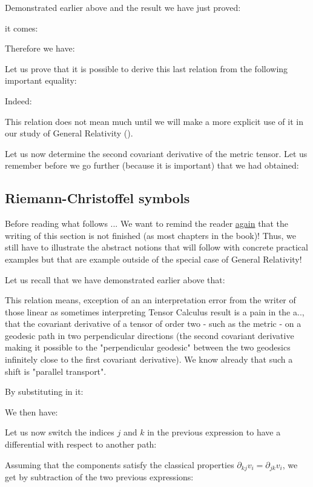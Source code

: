 	Demonstrated earlier above and the result we have just proved:
	
	it comes:
	
	Therefore we have:
	
	Let us prove that it is possible to derive this last relation from the following important equality:
	
	Indeed:
	
	This relation does not mean much until we will make a more explicit use of it in our study of General Relativity ().

	Let us now determine the second covariant derivative of the metric tensor. Let us remember before we go further (because it is important) that we had obtained:
	
	
	\subsection{Riemann-Christoffel symbols}\label{Riemann-Christoffel symbols}
	\begin{tcolorbox}[colback=red!5,borderline={1mm}{2mm}{red!5},arc=0mm,boxrule=0pt]
	\bcbombe Before reading what follows ... We want to remind the reader \underline{again} that the writing of this section is not finished (as most chapters in the book)! Thus, we still have to illustrate the abstract notions that will follow with concrete practical examples but that are example outside of the special case of General Relativity!
	\end{tcolorbox}
	
	Let us recall that we have demonstrated earlier above that:
	
	This relation means, exception of an an interpretation error from the writer of those linear as sometimes interpreting Tensor Calculus result is a pain in the a.., that the covariant derivative of a tensor of order two - such as the metric - on a geodesic path in two perpendicular directions (the second covariant derivative making it possible to the "perpendicular geodesic" between the two geodesics infinitely close to the first covariant derivative). We know already that such a shift is "parallel transport".
	
	By substituting in it:
	
	We then have:
	
	Let us now switch the indices $j$ and $k$ in the previous expression to have a differential with respect to another path:
	
	Assuming that the components satisfy the classical properties $\partial_{kj}v_i=\partial_{jk}v_i$, we get by subtraction of the two previous expressions:
	
